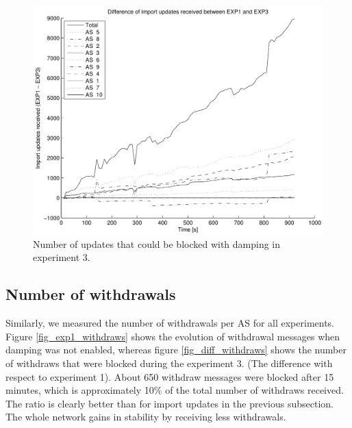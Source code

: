 \documentclass[a4paper,english]{IEEEtran}
\begin{document}
\begin{figure}
\begin{center}
\includegraphics[scale=.5]{img/diff_exp1_exp3_updates.pdf}
\end{center}
\caption{Number of updates that could be blocked with damping in experiment 3.}
\label{fig_diff_updates}
\end{figure}

\subsection{Number of withdrawals}

Similarly, we measured the number of withdrawals per AS for all experiments. 
Figure \ref{fig_exp1_withdraws} shows the evolution of withdrawal messages when damping was not enabled, whereas figure \ref{fig_diff_withdraws}
shows the number of withdraws that were blocked during the experiment 3. (The difference with respect to experiment 1).
About 650 withdraw messages were blocked after 15 minutes, which is approximately 10\% of the total number of withdraws received. The ratio is clearly 
better than for import updates in the previous subsection. The whole network gains in stability by receiving less withdrawals.
\end{document}
